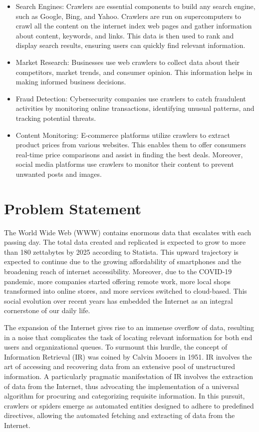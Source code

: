 \begin{itemize}
  \item Search Engines: Crawlers are essential components to build any search engine, such as Google, Bing, and Yahoo. Crawlers are run on supercomputers to crawl all the content on the internet index web pages and gather information about content, keywords, and links. This data is then used to rank and display search results, ensuring users can quickly find relevant information.
  \item Market Research: Businesses use web crawlers to collect data about their competitors, market trends, and consumer opinion. This information helps in making informed business decisions.
  \item Fraud Detection: Cybersecurity companies use crawlers to catch fraudulent activities by monitoring online transactions, identifying unusual patterns, and tracking potential threats.
  \item Content Monitoring: E-commerce platforms utilize crawlers to extract product prices from various websites. This enables them to offer consumers real-time price comparisons and assist in finding the best deals. Moreover, social media platforms use crawlers to monitor their content to prevent unwanted posts and images.
\end{itemize}

\section{Problem Statement}

The World Wide Web (WWW) contains enormous data that escalates with each passing day. The total data created and replicated is expected to grow to more than 180 zettabytes by 2025 according to Statista. This upward trajectory is expected to continue due to the growing affordability of smartphones and the broadening reach of internet accessibility. Moreover, due to the COVID-19 pandemic, more companies started offering remote work, more local shops transformed into online stores, and more services switched to cloud-based. This social evolution over recent years has embedded the Internet as an integral cornerstone of our daily life.

The expansion of the Internet gives rise to an immense overflow of data, resulting in a noise that complicates the task of locating relevant information for both end users and organizational queues. To surmount this hurdle, the concept of Information Retrieval (IR) was coined by Calvin Mooers in 1951. IR involves the art of accessing and recovering data from an extensive pool of unstructured information. A particularly pragmatic manifestation of IR involves the extraction of data from the Internet, thus advocating the implementation of a universal algorithm for procuring and categorizing requisite information. In this pursuit, crawlers or spiders emerge as automated entities designed to adhere to predefined directives, allowing the automated fetching and extracting of data from the Internet.

